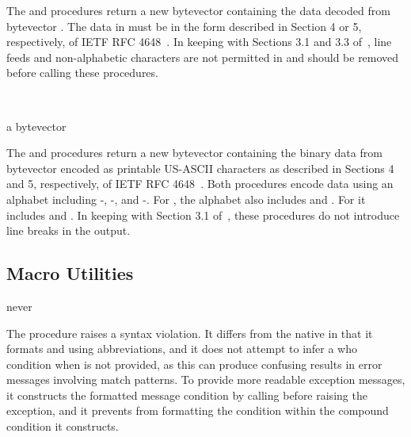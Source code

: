 The  and 
procedures return a new bytevector containing the data decoded from bytevector
.
The data in  must be in the form described in Section 4 or 5,
respectively, of IETF RFC 4648~\cite{rfc4648}.
In keeping with Sections 3.1 and 3.3 of~\cite{rfc4648},
line feeds and non-alphabetic characters are not permitted
in  and should be removed before calling these procedures.

\begin{procedure}
  \strut\\
  \strut
\end{procedure}
\returns{} a bytevector

The  and 
procedures return a new byte\-vector containing the binary data from bytevector
 encoded as printable US-ASCII characters as described in Sections 4
and 5, respectively, of IETF RFC 4648~\cite{rfc4648}.
Both procedures encode data using an alphabet including -,
-, and -.
For , the alphabet also includes \code{+} and \code{/}.
For  it includes \code{-} and \code{\_}.
In keeping with Section 3.1 of~\cite{rfc4648}, these procedures
do not introduce line breaks in the output.

\subsection{Macro Utilities}

\begin{procedure}
\end{procedure}
\returns{} never

The  procedure raises a syntax violation.
It differs from the native  in that it formats
 and  using  abbreviations,
and it does not attempt to infer a who condition when  is not
provided, as this can produce confusing results in error messages
involving match patterns.
To provide more readable exception messages, it constructs the formatted
message condition by calling  before raising the exception,
and it prevents  from formatting the 
condition within the compound condition it constructs.

